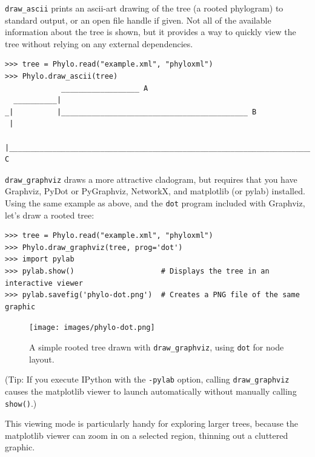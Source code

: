 \documentclass{report}
\begin{document}
\verb|draw_ascii| prints an ascii-art drawing of the tree (a rooted phylogram) to standard
output, or an open file handle if given. Not all of the available information about the tree is
shown, but it provides a way to quickly view the tree without relying on any external
dependencies.

\begin{verbatim}
>>> tree = Phylo.read("example.xml", "phyloxml")
>>> Phylo.draw_ascii(tree)
             __________________ A
  __________|
_|          |___________________________________________ B
 |
 |___________________________________________________________________________ C

\end{verbatim}

\verb|draw_graphviz| draws a more attractive cladogram, but requires that you have Graphviz,
PyDot or PyGraphviz, NetworkX, and matplotlib (or pylab) installed. Using the same example as
above, and the \verb|dot| program included with Graphviz, let's draw a rooted tree:

\begin{verbatim}
>>> tree = Phylo.read("example.xml", "phyloxml")
>>> Phylo.draw_graphviz(tree, prog='dot')
>>> import pylab
>>> pylab.show()                    # Displays the tree in an interactive viewer
>>> pylab.savefig('phylo-dot.png')  # Creates a PNG file of the same graphic
\end{verbatim}

\begin{htmlonly}
\label{fig:phylo-dot}
\end{htmlonly}

\begin{latexonly}
\begin{figure}[htb]
\centering
\texttt{[image: images/phylo-dot.png]}
\caption{A simple rooted tree drawn with {\tt draw\_graphviz}, using {\tt dot} for node
layout.}
\label{fig:phylo-dot}
\end{figure}
\end{latexonly}

(Tip: If you execute IPython with the \verb|-pylab| option, calling \verb|draw_graphviz| causes
the matplotlib viewer to launch automatically without manually calling \verb|show()|.)

This viewing mode is particularly handy for exploring larger trees, because the matplotlib
viewer can zoom in on a selected region, thinning out a cluttered graphic.
\end{document}
